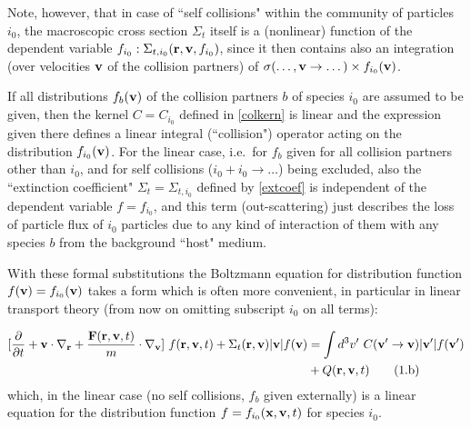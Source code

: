 Note, however, that in case of ``self collisions" within the community of
particles $i_0$, the macroscopic cross section $\Sigma_t$ itself is a
(nonlinear) function of the dependent variable $f_{i_0}:
  \Sigma_{t,i_0}
  (\mathbf{r},\mathbf{v},f_{i_0})$, since it then contains also an integration (over velocities
$\mathbf{v}$ of the collision partners) of $\sigma(\dots, \mathbf{v} \rightarrow \dots)
  \times f_{i_0}(\mathbf{v})$.


\vspace{1em}

If all distributions $f_b(\mathbf{v})$ of  the collision partners $b$ of species $i_0$
are assumed to be given, then the kernel $C = C_{i_0}$ defined in
\cref{colkern} is linear and the expression given there defines  a linear
integral (``collision") operator acting on the distribution $f_{i_0}(\mathbf{v})$.
For the linear case, i.e.\ for $f_b$ given for all collision partners other
than $i_0$, and for self collisions ($i_0 + i_0 \rightarrow \dots$) being
excluded, also the ``extinction coefficient" $\Sigma_t = \Sigma_{t,i_0}$
defined by \cref{extcoef} is independent of the dependent variable $f =
  f_{i_0}$, and this term (out-scattering) just describes the loss of particle
flux of $i_0$ particles due to any kind of interaction of them with any species
$b$ from the background ``host" medium.

With these formal substitutions the Boltzmann equation for distribution
function $f(\mathbf{v}) = f_{i_0}(\mathbf{v})$ takes a form which is often more convenient,
in particular in linear transport theory (from now on omitting subscript $i_0$
on all terms):

\begin{align}
  \label{eq1b}
  \lbrack\frac\partial{\partial t} + \mathbf{v} \cdot
  \nabla_{\mathbf{r}} +
  \frac{\mathbf{F}(\mathbf{r},\mathbf{v},t)}{m} \cdot
  \nabla_{\mathbf{v}}\rbrack \ f(\mathbf{r},\mathbf{v},t) +
  \Sigma_t(\mathbf{r},\mathbf{v}) |\mathbf{v}|
  f(\mathbf{v})
   & =
  \int d^3{v}' \ C(\mathbf{v}' \rightarrow \mathbf{v})
  |\mathbf{v}'|
  f(\mathbf{v}') \nonumber           \\
   & + Q(\mathbf{r},\mathbf{v},t) \tag{1.b}
\end{align}
which, in the linear case (no self collisions, $f_b$ given externally) is a
linear equation for the distribution
function $f = f_{i_0}
  (\mathbf{x},\mathbf{v},t)$ for species $i_0$.

